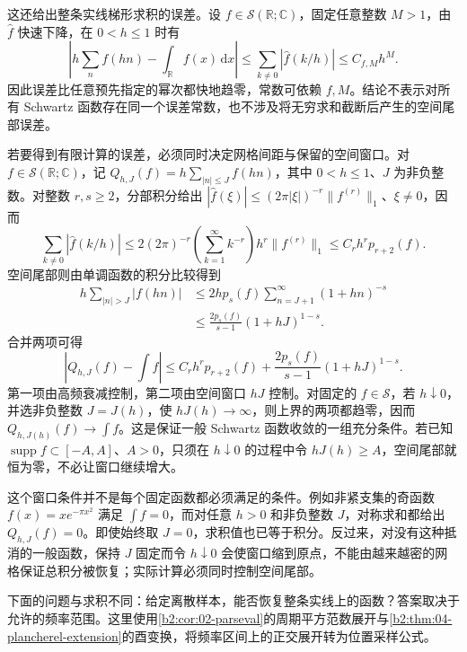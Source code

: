 这还给出整条实线梯形求积的误差。设 \(f\in\mathcal S(\mathbb R;\mathbb C)\)，固定任意整数 \(M>1\)，由 \(\widehat f\) 快速下降，在 \(0<h\leq1\) 时有
\[
 \left|h\sum_nf(hn)-\int_{\mathbb R}f(x)\,\mathrm{d}x\right|
 \leq\sum_{k\ne0}|\widehat f(k/h)|\leq C_{f,M}h^M.
\]
因此误差比任意预先指定的幂次都快地趋零，常数可依赖 \(f,M\)。结论不表示对所有 Schwartz 函数存在同一个误差常数，也不涉及将无穷求和截断后产生的空间尾部误差。

\ProseParagraphBreak

若要得到有限计算的误差，必须同时决定网格间距与保留的空间窗口。对 \(f\in\mathcal S(\mathbb R;\mathbb C)\)，记 \(Q_{h,J}(f)=h\sum_{|n|\leq J}f(hn)\)，其中 \(0<h\leq1\)、\(J\) 为非负整数。对整数 \(r,s\geq2\)，分部积分给出 \(|\widehat f(\xi)|\leq(2\pi|\xi|)^{-r}\|f^{(r)}\|_1\)、\(\xi\ne0\)，因而
\[
 \sum_{k\ne0}|\widehat f(k/h)|
 \leq 2(2\pi)^{-r}\left(\sum_{k=1}^\infty k^{-r}\right)
       h^r\|f^{(r)}\|_1
 \leq C_r h^r p_{r+2}(f).
\]
空间尾部则由单调函数的积分比较得到
\[
 \begin{aligned}
 h\sum_{|n|>J}|f(hn)|
 &\leq2hp_s(f)\sum_{n=J+1}^\infty(1+hn)^{-s}\\
 &\leq\frac{2p_s(f)}{s-1}(1+hJ)^{1-s}.
 \end{aligned}
\]
合并两项可得
\[
 |Q_{h,J}(f)-\textstyle\int f|
 \leq C_r h^rp_{r+2}(f)
       +\frac{2p_s(f)}{s-1}(1+hJ)^{1-s}.
\]
第一项由高频衰减控制，第二项由空间窗口 \(hJ\) 控制。对固定的 \(f\in\mathcal S\)，若 \(h\downarrow0\)，并选非负整数 \(J=J(h)\)，使 \(hJ(h)\to\infty\)，则上界的两项都趋零，因而 \(Q_{h,J(h)}(f)\to\int f\)。这是保证一般 Schwartz 函数收敛的一组充分条件。若已知 \(\operatorname{supp}f\subset[-A,A]\)、\(A>0\)，只须在 \(h\downarrow0\) 的过程中令 \(hJ(h)\geq A\)，空间尾部就恒为零，不必让窗口继续增大。

这个窗口条件并不是每个固定函数都必须满足的条件。例如非紧支集的奇函数 \(f(x)=xe^{-\pi x^2}\) 满足 \(\int f=0\)，而对任意 \(h>0\) 和非负整数 \(J\)，对称求和都给出 \(Q_{h,J}(f)=0\)。即使始终取 \(J=0\)，求积值也已等于积分。反过来，对没有这种抵消的一般函数，保持 \(J\) 固定而令 \(h\downarrow0\) 会使窗口缩到原点，不能由越来越密的网格保证总积分被恢复；实际计算必须同时控制空间尾部。


下面的问题与求积不同：给定离散样本，能否恢复整条实线上的函数？答案取决于允许的频率范围。这里使用\cref{b2:cor:02-parseval}的周期平方范数展开与\cref{b2:thm:04-plancherel-extension}的酉变换，将频率区间上的正交展开转为位置采样公式。

